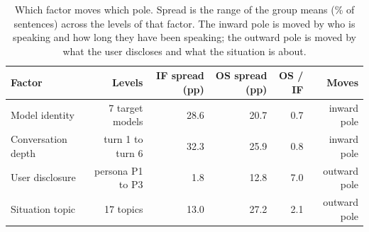 \begin{table}[t]
\centering
\small
\caption{Which factor moves which pole. Spread is the range of the group means (\% of sentences) across the levels of that factor. The inward pole is moved by who is speaking and how long they have been speaking; the outward pole is moved by what the user discloses and what the situation is about.}
\label{tab:dissociation}
\begin{tabular}{lrrrrr}
\toprule
Factor & Levels & IF spread (pp) & OS spread (pp) & OS / IF & Moves \\
\midrule
Model identity & 7 target models & 28.6 & 20.7 & 0.7 & inward pole \\
Conversation depth & turn 1 to turn 6 & 32.3 & 25.9 & 0.8 & inward pole \\
User disclosure & persona P1 to P3 & 1.8 & 12.8 & 7.0 & outward pole \\
Situation topic & 17 topics & 13.0 & 27.2 & 2.1 & outward pole \\
\bottomrule
\end{tabular}
\end{table}
